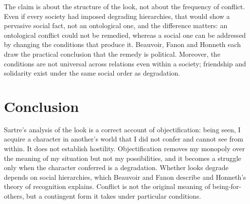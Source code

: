 \documentclass{situationist-preprint}
\begin{document}
\begin{reply}
The claim is about the structure of the look, not about the frequency of conflict. Even if every society had imposed degrading hierarchies, that would show a pervasive social fact, not an ontological one, and the difference matters: an ontological conflict could not be remedied, whereas a social one can be addressed by changing the conditions that produce it. Beauvoir, Fanon and Honneth each draw the practical conclusion that the remedy is political. Moreover, the conditions are not universal across relations even within a society; friendship and solidarity exist under the same social order as degradation.
\end{reply}

\section{Conclusion}

Sartre's analysis of the look is a correct account of objectification: being seen, I acquire a character in another's world that I did not confer and cannot see from within. It does not establish hostility. Objectification removes my monopoly over the meaning of my situation but not my possibilities, and it becomes a struggle only when the character conferred is a degradation. Whether looks degrade depends on social hierarchies, which Beauvoir and Fanon describe and Honneth's theory of recognition explains. Conflict is not the original meaning of being-for-others, but a contingent form it takes under particular conditions.
\end{document}
